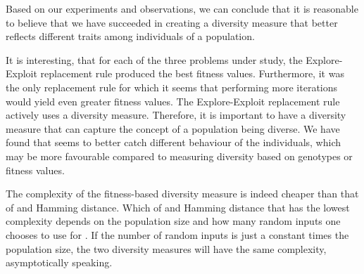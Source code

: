 Based on our experiments and observations, we can conclude that it is reasonable to believe that we have succeeded in creating a diversity measure that better reflects different traits among individuals of a population.

It is interesting, that for each of the three problems under study, the Explore-Exploit replacement rule produced the best fitness values. Furthermore, it was the only replacement rule for which it seems that performing more iterations would yield even greater fitness values. 
The Explore-Exploit replacement rule actively uses a diversity measure.
Therefore, it is important to have a diversity measure that can capture the concept of a population being diverse.
We have found that \dia{} seems to better catch different behaviour of the individuals, which may be more favourable compared to measuring diversity based on genotypes or fitness values.

The complexity of the fitness-based diversity measure is indeed cheaper than that of \dia{} and Hamming distance.
Which of \dia{} and Hamming distance that has the lowest complexity depends on the population size and how many random inputs one chooses to use for \dia{}. If the number of random inputs is just a constant times the population size, the two diversity measures will have the same complexity, asymptotically speaking.
